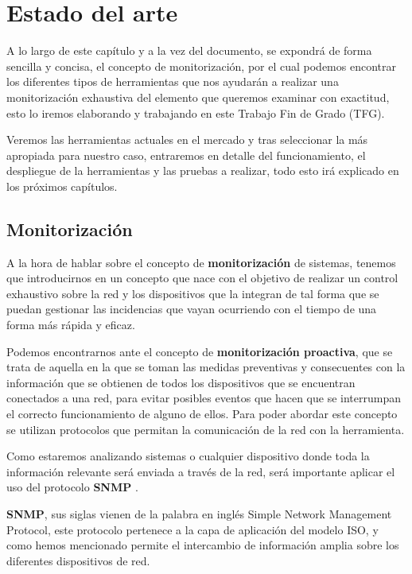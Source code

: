 \chapter{Estado del arte} \label{ch:estado}

A lo largo de este capítulo y a la vez del documento, se expondrá de forma sencilla y concisa, el concepto de monitorización, por el cual podemos encontrar los diferentes tipos de herramientas que nos ayudarán a realizar una monitorización exhaustiva del elemento que queremos examinar con exactitud, esto lo iremos elaborando y trabajando en este Trabajo Fin de Grado (TFG).

Veremos las herramientas actuales en el mercado y tras seleccionar la más apropiada para nuestro caso, entraremos en detalle del funcionamiento, el despliegue de la herramientas y las pruebas a realizar, todo esto irá explicado en los próximos capítulos.

\section{Monitorización}

A la hora de hablar sobre el concepto de \textbf{monitorización} de sistemas, tenemos que introducirnos en un concepto que nace con el objetivo de realizar un control exhaustivo sobre la red y los dispositivos que la integran de tal forma que se puedan gestionar las incidencias que vayan ocurriendo con el tiempo de una forma más rápida y eficaz.

Podemos encontrarnos ante el concepto de \textbf{monitorización proactiva}, que se trata de aquella en la que se toman las medidas preventivas y consecuentes con la información que se obtienen de todos los dispositivos que se encuentran conectados a una red, para evitar posibles eventos que hacen que se interrumpan el correcto funcionamiento de alguno de ellos.
\newpage
Para poder abordar este concepto se utilizan protocolos que permitan la comunicación de la red con la herramienta. 

Como estaremos analizando sistemas o cualquier dispositivo donde toda la información relevante será enviada a través de la red, será importante aplicar el uso del protocolo \textbf{SNMP} \cite{snmp}.

\textbf{SNMP}, sus siglas vienen de la palabra en inglés Simple Network Management Protocol, este protocolo pertenece a la capa de aplicación del modelo ISO, y como hemos mencionado permite el intercambio de información amplia sobre los diferentes dispositivos de red.

